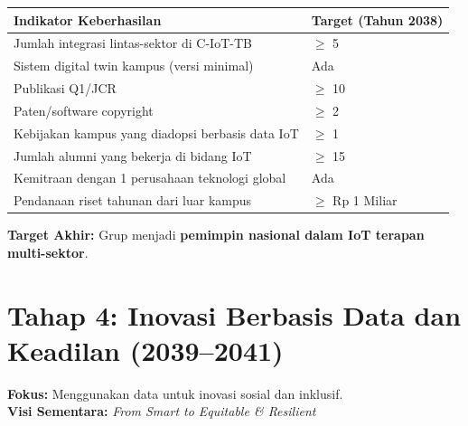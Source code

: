 \documentclass[11pt,a4paper]{article}
\begin{document}
\begin{center}
    \begin{tabular}{ll}
        \toprule
        \textbf{Indikator Keberhasilan}                  & \textbf{Target (Tahun 2038)} \\
        \midrule
        Jumlah integrasi lintas-sektor di C-IoT-TB       & $\geq$ 5                     \\
        Sistem digital twin kampus (versi minimal)       & Ada                          \\
        Publikasi Q1/JCR                                 & $\geq$ 10                    \\
        Paten/software copyright                         & $\geq$ 2                     \\
        Kebijakan kampus yang diadopsi berbasis data IoT & $\geq$ 1                     \\
        Jumlah alumni yang bekerja di bidang IoT         & $\geq$ 15                    \\
        Kemitraan dengan 1 perusahaan teknologi global   & Ada                          \\
        Pendanaan riset tahunan dari luar kampus         & $\geq$ Rp 1 Miliar           \\
        \bottomrule
    \end{tabular}
\end{center}

\textbf{Target Akhir:} Grup menjadi \textbf{pemimpin nasional dalam IoT terapan multi-sektor}.

\section{Tahap 4: Inovasi Berbasis Data dan Keadilan (2039–2041)}
\label{sec:tahap4}

\textbf{Fokus:} Menggunakan data untuk inovasi sosial dan inklusif.\\
\textbf{Visi Sementara:} \textit{From Smart to Equitable \& Resilient}
\end{document}
